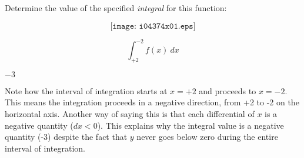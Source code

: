 

Determine the value of the specified {\it integral} for this function:

$$\texttt{[image: i04374x01.eps]}$$

$$\int_{+2}^{-2} f(x) \> dx$$







$-3$

\vskip 10pt

Note how the interval of integration starts at $x = +2$ and proceeds to $x = -2$.  This means the integration proceeds in a negative direction, from +2 to -2 on the horizontal axis.  Another way of saying this is that each differential of $x$ is a negative quantity ($dx < 0$).  This explains why the integral value is a negative quantity (-3) despite the fact that $y$ never goes below zero during the entire interval of integration.











